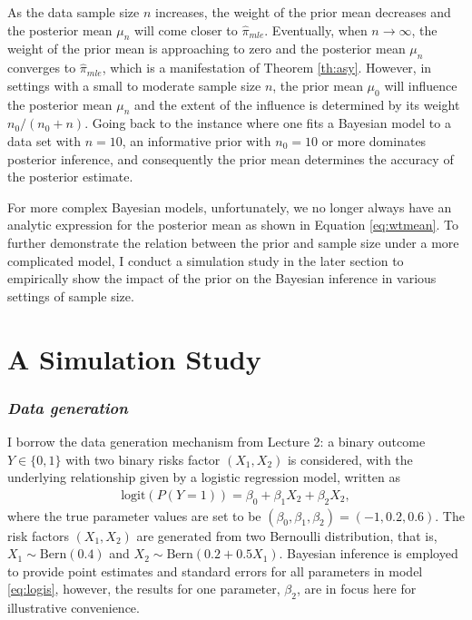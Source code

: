 \documentclass{article}
\numberwithin{equation}{section}
\theoremstyle{plain}
\begin{document}
As the data sample size $n$ increases, the weight of the prior mean decreases and the posterior mean $\mu_n$ will come closer to $\hat{\pi}_{mle}$. Eventually, when $n \rightarrow \infty$, the weight of the prior mean is approaching to zero and the posterior mean $\mu_n$ converges to $\hat{\pi}_{mle}$, which is a manifestation of Theorem \ref{th:asy}. However, in settings with a small to moderate sample size $n$, the prior mean $\mu_0$ will influence the posterior mean $\mu_n$ and the extent of the influence is determined by its weight $n_0/(n_0+n)$. Going back to the instance where one fits a Bayesian model to a data set with $n=10$, an informative prior with $n_0=10$ or more dominates posterior inference, and consequently the prior mean determines the accuracy of the posterior estimate. 

For more complex Bayesian models, unfortunately, we no longer always have an analytic expression for the posterior mean as shown in Equation \eqref{eq:wtmean}. To further demonstrate the relation between the prior and sample size under a more complicated model, I conduct a simulation study in the later section to empirically show the impact of the prior on the Bayesian inference in various settings of sample size. 

\section{A Simulation Study}
\label{sec:sim}
\subsubsection*{\textit{Data generation}}
I borrow the data generation mechanism from Lecture 2: a binary outcome $Y \in \{0,1\}$ with two binary risks factor $(X_1, X_2)$ is considered, with the underlying relationship given by a logistic regression model, written as
\begin{align}\label{eq:logis}
    \mathrm{logit}(P(Y=1))=\beta_0+\beta_1X_2+\beta_2X_2,
\end{align}
where the true parameter values are set to be $(\beta_0, \beta_1, \beta_2)=(-1,0.2, 0.6)$. The risk factors $(X_1, X_2)$ are generated from two Bernoulli distribution, that is, $X_1\sim \mathrm{Bern}(0.4)$ and $X_2\sim \mathrm{Bern}(0.2+0.5X_1)$. Bayesian inference is employed to provide point estimates and standard errors for all parameters in model \eqref{eq:logis}, however, the results for one parameter, $\beta_2$, are in focus here for illustrative convenience. 
\end{document}
